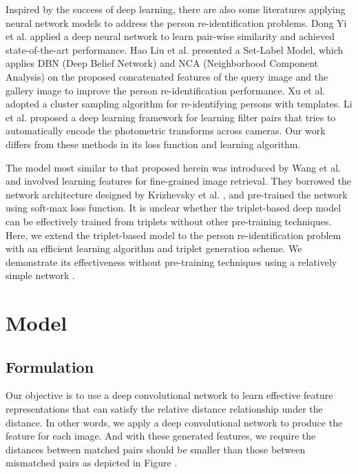 \documentclass[review]{elsarticle}
\begin{document}
Inspired by the success of deep learning, there are also some literatures applying neural network models to address the person re-identification problems. Dong Yi et al. \cite{DBLP:journals/corr/YiLL14} applied a deep neural network to learn pair-wise similarity and achieved state-of-the-art performance. Hao Liu et al. \cite{Liu20151283} presented a Set-Label Model, which applies DBN (Deep Belief Network) and NCA (Neighborhood Component Analysis) on the proposed concatenated features of the query image and the gallery image to improve the person re-identification performance. Xu et al. \cite{xu2013human} adopted a cluster sampling algorithm \cite{lin2010layered} for re-identifying persons with templates. Li et al. \cite{li2013deepreid} proposed a deep learning framework for learning filter pairs that tries to automatically encode the photometric transforms across cameras. Our work differs from these methods in its loss function and learning algorithm.

The model most similar to that proposed herein was introduced by Wang et al. \cite{wang2014learning} and involved learning features for fine-grained image retrieval. They borrowed the network architecture designed by Krizhevsky et al. \cite{krizhevsky2012imagenet}, and pre-trained the network using soft-max loss function. It is unclear whether the triplet-based deep model can be effectively trained from triplets without other pre-training techniques. Here,  we extend the triplet-based model to the person re-identification problem with an efficient learning algorithm and triplet generation scheme. We demonstrate its effectiveness without pre-training techniques using a relatively simple network .

\section{Model}

\subsection{Formulation}
Our objective is to use a deep convolutional network to learn effective feature representations that can satisfy the relative distance relationship under the  distance. In other words, we apply a deep convolutional network to produce the feature for each image. And with these generated features, we require the distances between matched pairs should be smaller than those between mismatched pairs as depicted in Figure . 
\end{document}
